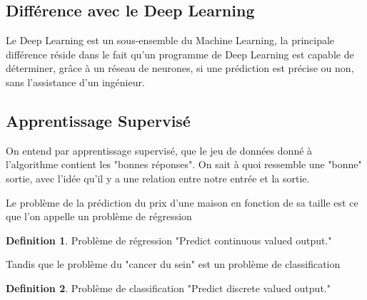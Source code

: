 \documentclass{article}
\theoremstyle{definition}
\newtheorem{definition}{Definition}[section]
\begin{document}
\subsection{Différence avec le Deep Learning}
Le Deep Learning est un sous-ensemble du Machine Learning, la principale différence réside dans le fait qu'un programme de Deep Learning est capable de déterminer, grâce à un réseau de neurones, si une prédiction est précise ou non, sans l'assistance d'un ingénieur.\par
\subsection{Apprentissage Supervisé}
On entend par apprentissage supervisé, que le jeu de données donné à l'algorithme contient les "bonnes réponses". On sait à quoi ressemble une "bonne" sortie, avec l'idée qu'il y a une relation entre notre entrée et la sortie.\par \bigskip
Le problème de la prédiction du prix d'une maison en fonction de sa taille est ce que l'on appelle un problème de régression
\begin{definition}{Problème de régression}
"Predict continuous valued output."
\end{definition}
 	Tandis que le problème du "cancer du sein" est un problème de classification
 	\begin{definition}{Problème de classification}
"Predict discrete valued output."
\end{definition}
\end{document}
